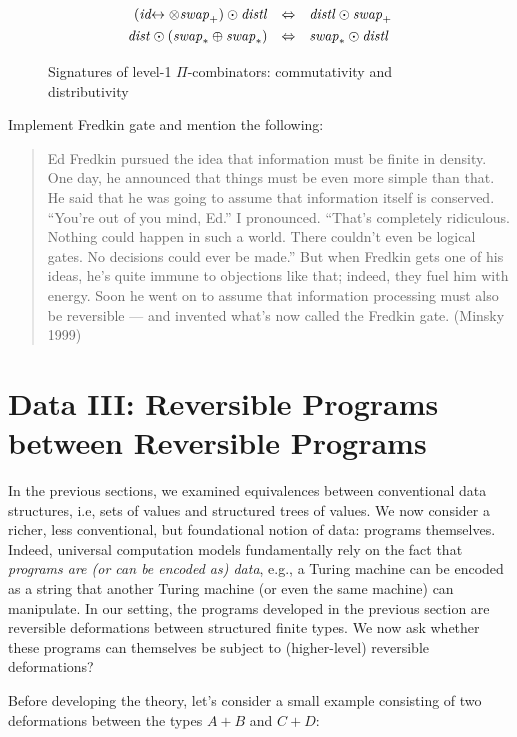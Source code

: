\documentclass{article}
\newcommand{\swapp}{\mathit{swap}_+}
\newcommand{\swapt}{\mathit{swap}_*}
\newcommand{\dist}{\mathit{dist}}
\newcommand{\distl}{\mathit{distl}}
\newcommand{\idc}{\mathit{id}\!\!\leftrightarrow}
\begin{document}
\begin{figure}[t]
\[\def\arraystretch{1.3}
\begin{array}{rcl}
  (\idc \otimes \swapp) \odot \distl &\Leftrightarrow& \distl \odot \swapp
\\
  \dist \odot (\swapt \oplus \swapt) &\Leftrightarrow & \swapt \odot \distl
\end{array}\]
\caption{\label{figa}Signatures of level-1 $\Pi$-combinators: commutativity and distributivity}
\end{figure}

Implement Fredkin gate and mention the following:

\begin{quote}
  Ed Fredkin pursued the idea that information must be finite in
  density. One day, he announced that things must be even more simple
  than that. He said that he was going to assume that information
  itself is conserved. “You’re out of you mind, Ed.” I
  pronounced. “That’s completely ridiculous. Nothing could happen in
  such a world. There couldn’t even be logical gates. No decisions
  could ever be made.” But when Fredkin gets one of his ideas, he’s
  quite immune to objections like that; indeed, they fuel him with
  energy. Soon he went on to assume that information processing must
  also be reversible — and invented what’s now called the Fredkin
  gate. (Minsky 1999)
\end{quote}

\section{Data III: Reversible Programs between Reversible Programs}

In the previous sections, we examined equivalences between
conventional data structures, i.e, sets of values and structured trees
of values. We now consider a richer, less conventional, but
foundational notion of data: programs themselves. Indeed, universal
computation models fundamentally rely on the fact that \emph{programs
are (or can be encoded as) data}, e.g., a Turing machine can be
encoded as a string that another Turing machine (or even the same
machine) can manipulate. In our setting, the programs developed in the
previous section are reversible deformations between structured finite
types. We now ask whether these programs can themselves
be subject to (higher-level) reversible deformations?

Before developing the theory, let's consider a small example
consisting of two deformations between the types $A + B$ and $C+D$:
\end{document}
